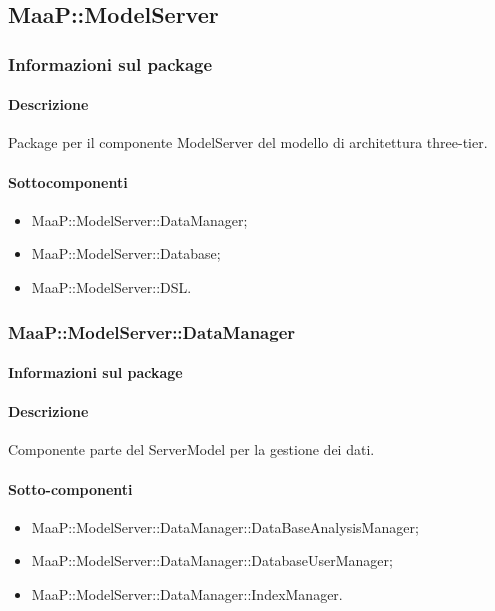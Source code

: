 \subsection{MaaP::ModelServer}
\subsubsection{Informazioni sul package}
\paragraph{Descrizione}
Package per il componente ModelServer del modello di architettura three-tier.

\paragraph{Sottocomponenti}
\begin{itemize}
\item MaaP::ModelServer::DataManager;
\item MaaP::ModelServer::Database;
\item MaaP::ModelServer::DSL.
\end{itemize}

\subsubsection{MaaP::ModelServer::DataManager}
\paragraph{Informazioni sul package}
\paragraph{Descrizione}
Componente parte del ServerModel per la gestione dei dati.
\paragraph{Sotto-componenti}
\begin{itemize}
\item MaaP::ModelServer::DataManager::DataBaseAnalysisManager;
\item MaaP::ModelServer::DataManager::DatabaseUserManager;
\item MaaP::ModelServer::DataManager::IndexManager.
\end{itemize}

